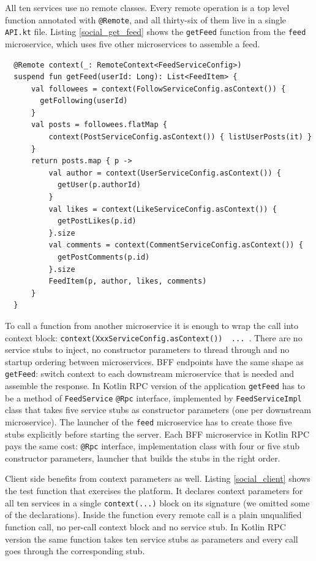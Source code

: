 \documentclass[a4paper,11pt,oneside]{article}
\newcommand{\kotlini}[1]{\texttt{#1}}
\newcommand{\ki}[1]{\kotlini{#1}}
\begin{document}
All ten services use no remote classes. Every remote operation is a top level function annotated
with \kotlini{@Remote}, and all thirty-six of them live in a single \kotlini{API.kt} file.
Listing \ref{social_get_feed} shows the \ki{getFeed} function from the \kotlini{feed}
microservice, which uses five other microservices to assemble a feed.

\begin{listing}[!h]
  \begin{verbatim}
  @Remote context(_: RemoteContext<FeedServiceConfig>)
  suspend fun getFeed(userId: Long): List<FeedItem> {
      val followees = context(FollowServiceConfig.asContext()) { 
        getFollowing(userId) 
      }
      val posts = followees.flatMap {
          context(PostServiceConfig.asContext()) { listUserPosts(it) }
      }
      return posts.map { p ->
          val author = context(UserServiceConfig.asContext()) { 
            getUser(p.authorId) 
          }
          val likes = context(LikeServiceConfig.asContext()) { 
            getPostLikes(p.id) 
          }.size
          val comments = context(CommentServiceConfig.asContext()) { 
            getPostComments(p.id) 
          }.size
          FeedItem(p, author, likes, comments)
      }
  }
  \end{verbatim}
  \caption{Service-to-service orchestration in social platform}\label{social_get_feed}
\end{listing}

To call a function from another microservice it is enough to wrap the call into context block:
\kotlini{context(XxxServiceConfig.asContext()) { ... }}. There are no service stubs to
inject, no constructor parameters to thread through and no startup ordering between
microservices. BFF endpoints have the same shape as \kotlini{getFeed}: switch context to each
downstream microservice that is needed and assemble the response. In Kotlin RPC version of the
application \kotlini{getFeed} has to be a method of \kotlini{FeedService} \kotlini{@Rpc}
interface, implemented by \kotlini{FeedServiceImpl} class that takes five service stubs as
constructor parameters (one per downstream microservice). The launcher of the \kotlini{feed}
microservice has to create those five stubs explicitly before starting the server. Each BFF
microservice in Kotlin RPC pays the same cost: \kotlini{@Rpc} interface, implementation class
with four or five stub constructor parameters, launcher that builds the stubs in the right
order.

Client side benefits from context parameters as well. Listing \ref{social_client} shows the test
function that exercises the platform. It declares context parameters for all ten services in a
single \kotlini{context(...)} block on its signature (we omitted some of the declarations). Inside
the function every remote call is a plain unqualified function call, no per-call context block and
no service stub. In Kotlin RPC version the same function takes ten service stubs as parameters and
every call goes through the corresponding stub.
\end{document}
